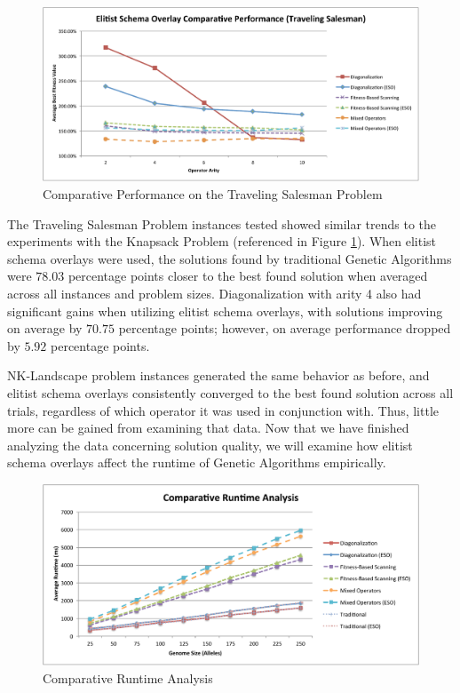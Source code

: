 \begin{figure}[htbp!]
\centering
\includegraphics[scale=0.55]{charts/Both_TSP.pdf}
\caption{Comparative Performance on the Traveling Salesman Problem}
\label{fig:both_tsp}
\end{figure}

The Traveling Salesman Problem instances tested showed similar trends to the experiments with the Knapsack Problem (referenced in Figure \ref{fig:both_tsp}). When elitist schema overlays were used, the solutions found by traditional Genetic Algorithms were $78.03$ percentage points closer to the best found solution when averaged across all instances and problem sizes. Diagonalization with arity 4 also had significant gains when utilizing elitist schema overlays, with solutions improving on average by $70.75$ percentage points; however, on average performance dropped by $5.92$ percentage points.


NK-Landscape problem instances generated the same behavior as before, and elitist schema overlays consistently converged to the best found solution across all trials, regardless of which operator it was used in conjunction with. Thus, little more can be gained from examining that data. Now that we have finished analyzing the data concerning solution quality, we will examine how elitist schema overlays affect the runtime of Genetic Algorithms empirically. 

\begin{figure}[htbp!]
\centering
\includegraphics[scale=0.55]{charts/Runtime.pdf}
\caption{Comparative Runtime Analysis}
\label{fig:runtime}
\end{figure}

